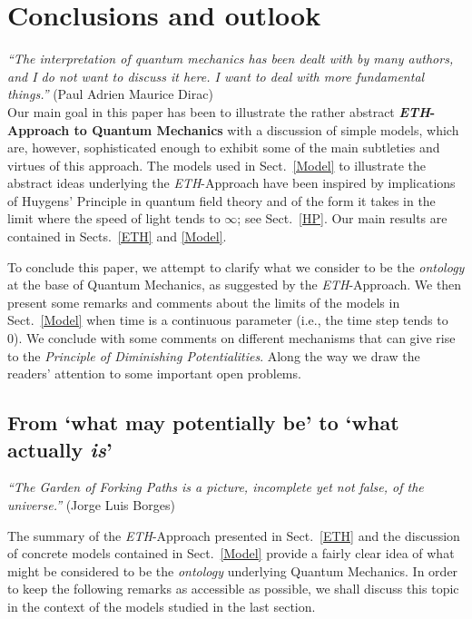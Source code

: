 \documentclass[12pt]{article}
\begin{document}
{\section{Conclusions and outlook}\label{Conclusions}

\hspace{0.5cm}\textit{``The interpretation of quantum mechanics has been dealt with by many authors, and I do not want to discuss it here. I want to deal with more fundamental things.''} (Paul Adrien Maurice Dirac)\\

Our main goal in this paper has been to illustrate the rather abstract {\bf{\textit{ETH}-Approach to Quantum Mechanics}} 
with a discussion of simple models, which are, however, sophisticated enough to exhibit some of the main subtleties 
and virtues of this approach. The models used in Sect.~\ref{Model} to illustrate the abstract ideas underlying the 
\textit{ETH}-Approach have been inspired by implications of Huygens' Principle in quantum field theory and of the form 
it takes in the limit where the speed of light tends to $\infty$; see Sect.~\ref{HP}. Our main results are contained in
Sects.~\ref{ETH} and \ref{Model}.

To conclude this paper, we attempt to clarify what we consider to be the \textit{ontology} at the base of Quantum 
Mechanics, as suggested by the \textit{ETH}-Approach. We then present some remarks and comments about the limits of 
the models in Sect.~\ref{Model} when time is a continuous parameter (i.e., the time step tends to 0). We conclude 
with some comments on different mechanisms that can give rise to the \textit{Principle of Diminishing Potentialities}. 
Along the way we draw the readers' attention to some important open problems.

\subsection{From `what may potentially be' to `what actually \textit{is}'}

\hspace{0.5cm}\textit{``The Garden of Forking Paths is a picture, incomplete yet not false, of the universe.''} (Jorge Luis Borges)

The summary of the \textit{ETH}-Approach presented in Sect.~\ref{ETH} and the discussion of concrete models contained 
in Sect.~\ref{Model} provide a fairly clear idea of what might be considered to be the \textit{ontology} underlying Quantum 
Mechanics. In order to keep the following remarks as accessible as possible, we shall discuss this topic in the 
context of the models studied in the last section.

}
\end{document}

